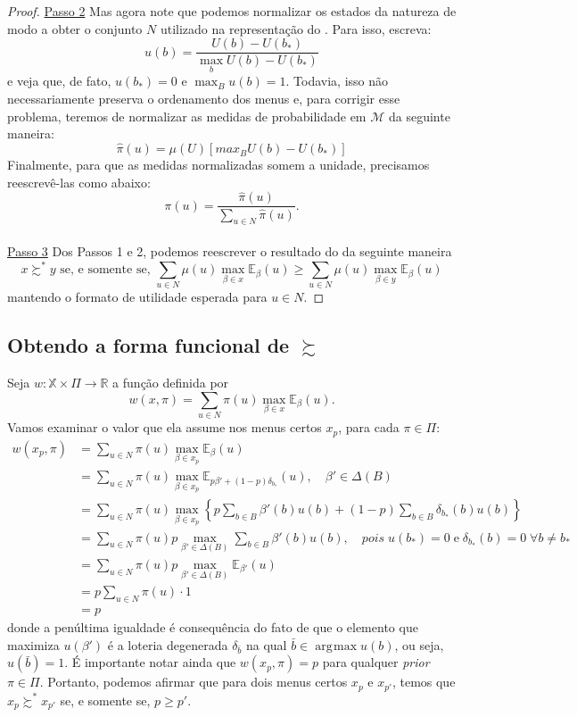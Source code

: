 \documentclass[11pt, a4paper]{article}
\theoremstyle{nonumberplain}
\newtheorem{proof}{Dem.}
\theoremstyle{plain}
\theoremstyle{plain}
\theoremstyle{plain}
\DeclareMathOperator*{\argmax}{\arg\!\max}
\begin{document}
\begin{proof}
\noindent
\underline{Passo 2} Mas agora note que podemos normalizar os estados da natureza de modo a obter o conjunto $N$ utilizado na representação do . Para isso, escreva:
$$u(b)=\frac{U(b)-U(b_*)}{\max_b U(b)-U(b_*)}$$  
e veja que, de fato, $u(b_*)=0$ e $\max_{B} u(b)=1$. Todavia, isso não necessariamente preserva o ordenamento dos menus e, para corrigir esse problema, teremos de normalizar as medidas de probabilidade em $\mathcal{M}$ da seguinte maneira:
$$ \hat{\pi}(u)=\mu(U)\left[max_B U(b)-U(b_*)\right]$$ Finalmente, para que as medidas normalizadas somem a unidade, precisamos reescrevê-las como abaixo:  \[\pi(u)=\frac{\hat{\pi}(u)}{\sum_{u\in N}\hat{\pi}(u)}.\]\\

\noindent
\underline{Passo 3} Dos Passos 1 e 2, podemos reescrever o resultado do  da seguinte maneira $$x\succsim^* y \text{ se, e somente se, } \sum_{u\in N} \mu(u)\max_{\beta\in x}\mathbb{E}_\beta(u) \geq \sum_{u\in N} \mu(u)\max_{\beta\in y}\mathbb{E}_\beta(u)$$ 
mantendo o formato de utilidade esperada para $u\in N$.
\end{proof}

\subsection{Obtendo a forma funcional de $\succsim$}
Seja $w:\mathbb{X}\times \Pi\rightarrow \mathbb{R}$ a função definida por $$w(x,\pi)=\sum_{u\in N} \pi(u)\max_{\beta\in x}\mathbb{E}_\beta(u).$$ Vamos examinar o valor que ela assume nos menus certos $x_p$, para cada $\pi\in\Pi$:
\begin{align*}
w(x_p,\pi)&=\sum_{u\in N} \pi(u)\max_{\beta\in x_{p}}\mathbb{E}_\beta(u)\\
&= \sum_{u\in N} \pi(u)\max_{\beta\in x_{p}}\mathbb{E}_{p\beta'+(1-p)\delta_{b_*}}(u),\quad \beta'\in \Delta(B)\\
&=\sum_{u\in N} \pi(u)\max_{\beta\in x_{p}}\left\lbrace p \sum_{b\in B}\beta'(b)u(b)+(1-p)\sum_{b\in B}\delta_{b_*}(b)u(b)\right\rbrace \\
&=\sum_{u\in N} \pi(u)p\max_{\beta'\in \Delta(B)}\sum_{b\in B}\beta'(b)u(b), \quad pois \; u(b_*)=0\; \text{e}\; \delta_{b_*}(b)=0\; \forall b\neq b_*\\
&= \sum_{u\in N} \pi(u) p \max_{\beta'\in \Delta(B)} \mathbb{E}_{\beta'}(u)\\
&= p\sum_{u\in N}\pi(u)\cdot 1\\
&=p
\end{align*}
donde a penúltima igualdade é consequência do fato de que o elemento que maximiza $u(\beta')$ é a loteria degenerada $\delta_{\bar{b}}$ na qual $\bar{b}\in\argmax u(b)$, ou seja, $u(\bar{b})=1$. É importante notar ainda que $w(x_p,\pi)=p$ para qualquer \textit{prior} $\pi\in\Pi$. Portanto, podemos afirmar que para dois menus certos $x_p$ e $x_{p'}$, temos que $x_p\succsim^* x_{p'}$ se, e somente se, $p\geq p'$. 
\end{document}
